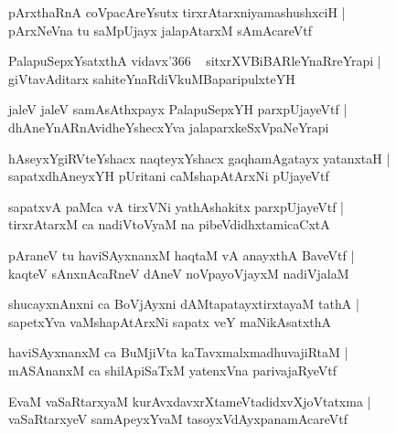 \documentclass[twoside,12pt,openright]{book}
\newcounter{shloka}[chapter]
\begin{document}
\begin{shloka}%
pArxthaRnA coVpacAreYsutx tirxrAtarxniyamashushxciH |\\
pArxNeVna tu saMpUjayx jalapAtarxM sAmAcareVtf
\end{shloka}

\begin{shloka}%
PalapuSepxYsatxthA vidavx\char'366 ~ sitxrXVBiBARleYnaRreYrapi |\\
giVtavAditarx sahiteYnaRdiVkuMBaparipulxteYH
\end{shloka}

\begin{shloka}%
jaleV jaleV samAsAthxpayx PalapuSepxYH parxpUjayeVtf |\\
dhAneYnARnAvidheYshecxYva jalaparxkeSxVpaNeYrapi
\end{shloka}

\begin{shloka}%
hAseyxYgiRVteYshacx naqteyxYshacx gaqhamAgatayx yatanxtaH |\\
sapatxdhAneyxYH pUritani caMshapAtArxNi pUjayeVtf 
\end{shloka}

\begin{shloka}%
sapatxvA paMca vA tirxVNi yathAshakitx parxpUjayeVtf |\\
tirxrAtarxM ca nadiVtoVyaM na pibeVdidhxtamicaCxtA
\end{shloka}

\begin{shloka}%
pAraneV tu haviSAyxnanxM haqtaM vA anayxthA BaveVtf |\\
kaqteV sAnxnAcaRneV dAneV noVpayoVjayxM nadiVjalaM 
\end{shloka}

\begin{shloka}%
shucayxnAnxni ca BoVjAyxni dAMtapatayxtirxtayaM tathA |\\
sapetxYva vaMshapAtArxNi sapatx veY maNikAsatxthA 
\end{shloka}

\begin{shloka}%
haviSAyxnanxM ca BuMjiVta kaTavxmalxmadhuvajiRtaM |\\
mASAnanxM ca shilApiSaTxM yatenxVna parivajaRyeVtf 
\end{shloka}

\begin{shloka}%
EvaM vaSaRtarxyaM kurAvxdavxrXtameVtadidxvXjoVtatxma |\\
vaSaRtarxyeV samApeyxYvaM tasoyxVdAyxpanamAcareVtf
\end{shloka}
\end{document}
